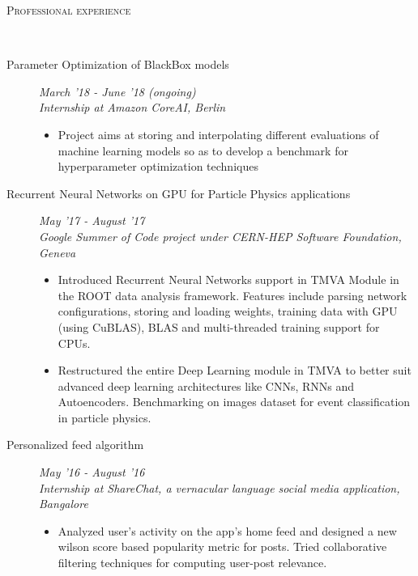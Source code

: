 \documentclass[9pt]{article}
\newenvironment{changemargin}[2]{%
  \begin{list}{}{%
    \setlength{\topsep}{0pt}%
    \setlength{\leftmargin}{#1}%
    \setlength{\rightmargin}{#2}%
    \setlength{\listparindent}{\parindent}%
    \setlength{\itemindent}{\parindent}%
    \setlength{\parsep}{\parskip}%
  }%
  \item[]}{\end{list}
}
\newcommand{\lineover}{
	\begin{changemargin}{-0.05in}{-0.10in}
		\vspace*{-9pt}
		\hrulefill \\
		\vspace*{-2pt}
	\end{changemargin}
}
\newcommand{\header}[1]{
	\begin{changemargin}{-0.5in}{-0.5in}
		\scshape{#1}\\
  	\lineover
	\end{changemargin}
}
\newenvironment{body} {
	\vspace*{-16pt}
	\begin{changemargin}{-0.6in}{-0.65in}
  }	
	{\end{changemargin}
}
\begin{document}
\header{Professional experience}
\begin{body}
 \vspace{14pt}

  \begin{description}
  \item[\normalsize{Parameter Optimization of BlackBox models}] \hfill \textit{March '18 - June '18 (ongoing)} \\
  \textit{Internship at Amazon CoreAI, Berlin}
 \begin{itemize}
	\item Project aims at storing and interpolating different evaluations of machine learning models so as to develop a benchmark for hyperparameter optimization 
	techniques
 \end{itemize}
  	
  \item[\normalsize{Recurrent Neural Networks on GPU for Particle Physics applications}] \hfill \textit{May '17 - August '17} \\
  \textit{Google Summer of Code project under CERN-HEP Software Foundation, Geneva}
  \begin{itemize}
  	\item Introduced Recurrent Neural Networks support in TMVA Module in the ROOT data analysis framework. Features include parsing network configurations, storing and loading weights, training data with GPU (using CuBLAS), BLAS and multi-threaded training support for CPUs.
   \item Restructured the entire Deep Learning module in TMVA to better suit advanced deep learning architectures like CNNs, RNNs and Autoencoders. Benchmarking on images dataset for event classification in particle physics.
  \end{itemize}
   
  \item [\normalsize{Personalized feed algorithm}] \hfill \textit{May '16 - August '16} \\
  \textit{Internship at ShareChat, a vernacular language social media application, Bangalore} \\
  \begin{itemize}
  	\item Analyzed user's activity on the app's home feed and designed a new wilson 	score based popularity metric for posts. Tried collaborative filtering techniques 
  	for computing user-post relevance.
  \end{itemize}
  	

\end{description}
\end{body}
\end{document}
